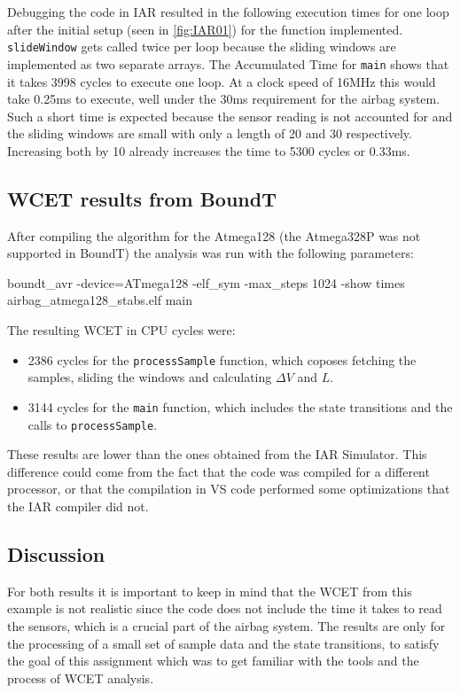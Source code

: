 Debugging the code in IAR resulted in the following execution times for one loop after the initial setup (seen in \ref{fig:IAR01}) for the function implemented. \texttt{slideWindow} gets called twice per loop because the sliding windows are implemented as two separate arrays. The Accumulated Time for \texttt{main} shows that it takes 3998 cycles to execute one loop. At a clock speed of 16MHz this would take 0.25ms to execute, well under the 30ms requirement for the airbag system. Such a short time is expected because the sensor reading is not accounted for and the sliding windows are small with only a length of 20 and 30 respectively. Increasing both by 10 already increases the time to 5300 cycles or 0.33ms.



\subsection{WCET results from BoundT} 
After compiling the algorithm for the Atmega128 (the Atmega328P was not supported in BoundT) the analysis was run with the following parameters: 

\begin{CCode}
    boundt_avr -device=ATmega128 -elf_sym -max_steps 1024 -show times airbag_atmega128_stabs.elf main 
\end{CCode}

The resulting WCET in CPU cycles were: 
\begin{itemize}
    \item 2386 cycles for the \texttt{processSample} function, which coposes fetching the samples, sliding the windows and calculating $\Delta V$ and $L$.
    \item 3144 cycles for the \texttt{main} function, which includes the state transitions and the calls to \texttt{processSample}. 
\end{itemize}

These results are lower than the ones obtained from the IAR Simulator. This difference could come from the fact that the code was compiled for a different processor, or that the compilation in VS code performed some optimizations that the IAR compiler did not. 

\subsection{Discussion}

For both results it is important to keep in mind that the WCET from this example is not realistic since the code does not include the time it takes to read the sensors, which is a crucial part of the airbag system. The results are only for the processing of a small set of sample data and the state transitions, to satisfy the goal of this assignment which was to get familiar with the tools and the process of WCET analysis.
